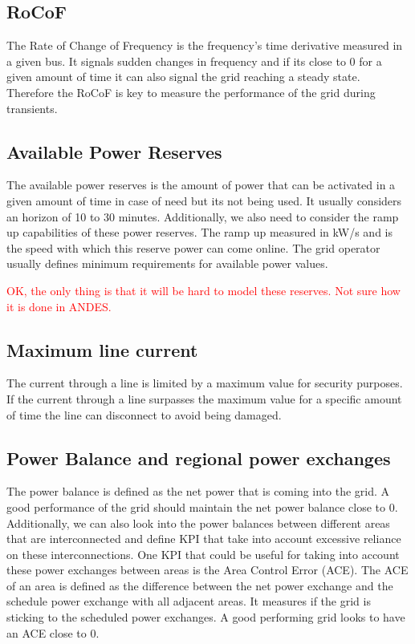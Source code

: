 \documentclass{article}
\begin{document}
\subsection*{RoCoF}

The Rate of Change of Frequency is the frequency's time derivative measured in a given bus. It signals sudden changes in frequency and if its close to $0$ for a given amount of time it can also signal the grid reaching a steady state. Therefore the RoCoF is key to measure the performance of the grid during transients. 

\subsection*{Available Power Reserves}

The available power reserves is the amount of power that can be activated in a given amount of time in case of need but its not being used. It usually considers an horizon of 10 to 30 minutes. Additionally, we also need to consider the ramp up capabilities of these power reserves. The ramp up measured in kW/s and is the speed with which this reserve power can come online. The grid operator usually defines minimum requirements for available power values.

\textcolor{red}{OK, the only thing is that it will be hard to model these reserves. Not sure how it is done in ANDES.}

\subsection*{Maximum line current}

The current through a line is limited by a maximum value for security purposes. If the current through a line surpasses the maximum value for a specific amount of time the line can disconnect to avoid being damaged.

\subsection*{Power Balance and regional power exchanges}

The power balance is defined as the net power that is coming into the grid. A good performance of the grid should maintain the net power balance close to 0. Additionally, we can also look into the power balances between different areas that are interconnected and define KPI that take into account excessive reliance on these interconnections. One KPI that could be useful for taking into account these power exchanges between areas is the Area Control Error (ACE). The ACE of an area is defined as the difference between the net power exchange and the schedule power exchange with all adjacent areas. It measures if the grid is sticking to the scheduled power exchanges. A good performing grid looks to have an ACE close to $0$.  
\end{document}
